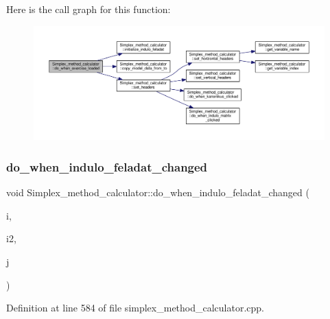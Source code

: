 Here is the call graph for this function\+:\nopagebreak
\begin{figure}[H]
\begin{center}
\leavevmode
\includegraphics[width=350pt]{classSimplex__method__calculator_a60dca1c8d54ea44325bbefad572d01a2_cgraph}
\end{center}
\end{figure}
\mbox{\label{classSimplex__method__calculator_a706085a8cbc9e0a452da0cd2807c5ea4}} 
\subsubsection{\texorpdfstring{do\+\_\+when\+\_\+indulo\+\_\+feladat\+\_\+changed}{do\_when\_indulo\_feladat\_changed}}
{\footnotesize\ttfamily void Simplex\+\_\+method\+\_\+calculator\+::do\+\_\+when\+\_\+indulo\+\_\+feladat\+\_\+changed (\begin{DoxyParamCaption}\item[{Q\+Model\+Index}]{i,  }\item[{Q\+Model\+Index}]{i2,  }\item[{const Q\+Vector$<$ int $>$ \&}]{j }\end{DoxyParamCaption})\hspace{0.3cm}{\ttfamily [slot]}}



Definition at line 584 of file simplex\+\_\+method\+\_\+calculator.\+cpp.

